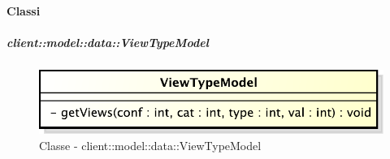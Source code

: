 	\paragraph{Classi} %
		\subparagraph{client::model::data::ViewTypeModel} %
		\label{subp:client_model_data_viewtypemodel}
			\begin{figure}[htbp]
				\centering
				\centerline{\includegraphics[scale=0.7]{./images/client/classes/model/view_type_model.pdf}}
				\caption{Classe - client::model::data::ViewTypeModel}
			\end{figure}
